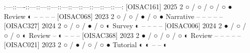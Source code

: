 {}\markdownRendererPipe{}:---:\markdownRendererPipe{}:----:\markdownRendererPipe{}:---:\markdownRendererPipe{}:---:\markdownRendererPipe{}:---:\markdownRendererPipe{}:---:\markdownRendererPipe{}:---:\markdownRendererPipe{}:---:\markdownRendererPipe{}:---:\markdownRendererPipe{}:---:\markdownRendererPipe{}:---:\markdownRendererPipe{}\markdownRendererSoftLineBreak
{}\markdownRendererPipe{} [O\markdownRendererUnderscore{}ISAC\markdownRendererUnderscore{}161] \markdownRendererPipe{} 2025 \markdownRendererPipe{} 2 \markdownRendererPipe{} ○ / ○ / ○ / ○ \markdownRendererPipe{} ● \markdownRendererPipe{} Review \markdownRendererPipe{} ◐ \markdownRendererPipe{} – \markdownRendererPipe{} – \markdownRendererPipe{} – \markdownRendererPipe{} – \markdownRendererPipe{}\markdownRendererSoftLineBreak
{}\markdownRendererPipe{} [O\markdownRendererUnderscore{}ISAC\markdownRendererUnderscore{}068] \markdownRendererPipe{} 2023 \markdownRendererPipe{} 2 \markdownRendererPipe{} ○ / ○ / ● / ○ \markdownRendererPipe{} ● \markdownRendererPipe{} Narrative \markdownRendererPipe{} – \markdownRendererPipe{} – \markdownRendererPipe{} – \markdownRendererPipe{} – \markdownRendererPipe{} – \markdownRendererPipe{}\markdownRendererSoftLineBreak
{}\markdownRendererPipe{} [O\markdownRendererUnderscore{}ISAC\markdownRendererUnderscore{}327] \markdownRendererPipe{} 2024 \markdownRendererPipe{} 2 \markdownRendererPipe{} ○ / ○ / ● / ○ \markdownRendererPipe{} ◐ \markdownRendererPipe{} Survey \markdownRendererPipe{} ◐ \markdownRendererPipe{} – \markdownRendererPipe{} – \markdownRendererPipe{} – \markdownRendererPipe{} – \markdownRendererPipe{}\markdownRendererSoftLineBreak
{}\markdownRendererPipe{} [O\markdownRendererUnderscore{}ISAC\markdownRendererUnderscore{}006] \markdownRendererPipe{} 2024 \markdownRendererPipe{} 2 \markdownRendererPipe{} ● / ○ / ○ / ○ \markdownRendererPipe{} ◐ \markdownRendererPipe{} Review \markdownRendererPipe{} – \markdownRendererPipe{} ◐ \markdownRendererPipe{} – \markdownRendererPipe{} – \markdownRendererPipe{} – \markdownRendererPipe{}\markdownRendererSoftLineBreak
{}\markdownRendererPipe{} [O\markdownRendererUnderscore{}ISAC\markdownRendererUnderscore{}368] \markdownRendererPipe{} 2023 \markdownRendererPipe{} 2 \markdownRendererPipe{} ● / ○ / ○ / ○ \markdownRendererPipe{} ◐ \markdownRendererPipe{} Review \markdownRendererPipe{} – \markdownRendererPipe{} – \markdownRendererPipe{} – \markdownRendererPipe{} – \markdownRendererPipe{} – \markdownRendererPipe{}\markdownRendererSoftLineBreak
{}\markdownRendererPipe{} [O\markdownRendererUnderscore{}ISAC\markdownRendererUnderscore{}021] \markdownRendererPipe{} 2023 \markdownRendererPipe{} 2 \markdownRendererPipe{} ○ / ● / ○ / ○ \markdownRendererPipe{} ● \markdownRendererPipe{} Tutorial \markdownRendererPipe{} ◐ \markdownRendererPipe{} ◐ \markdownRendererPipe{} – \markdownRendererPipe{} – \markdownRendererPipe{} ◐ \markdownRendererPipe{}\markdownRendererSoftLineBreak
